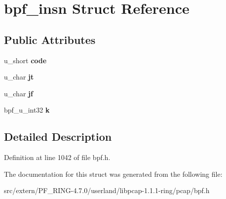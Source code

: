 \hypertarget{structbpf__insn}{
\section{bpf\_\-insn Struct Reference}
\label{structbpf__insn}
}
\subsection*{Public Attributes}
\begin{DoxyCompactItemize}
\item 
\hypertarget{structbpf__insn_a2da51f391465c2aa6d2bc4f88c9375f6}{
u\_\-short {\bfseries code}}
\label{structbpf__insn_a2da51f391465c2aa6d2bc4f88c9375f6}

\item 
\hypertarget{structbpf__insn_afd246d9d966166aa20443bdb4f02a924}{
u\_\-char {\bfseries jt}}
\label{structbpf__insn_afd246d9d966166aa20443bdb4f02a924}

\item 
\hypertarget{structbpf__insn_a7b51623c2f103793373f27465b7ce840}{
u\_\-char {\bfseries jf}}
\label{structbpf__insn_a7b51623c2f103793373f27465b7ce840}

\item 
\hypertarget{structbpf__insn_a233c23ce0d655662de5fb43607c498bf}{
bpf\_\-u\_\-int32 {\bfseries k}}
\label{structbpf__insn_a233c23ce0d655662de5fb43607c498bf}

\end{DoxyCompactItemize}


\subsection{Detailed Description}


Definition at line 1042 of file bpf.h.



The documentation for this struct was generated from the following file:\begin{DoxyCompactItemize}
\item 
src/extern/PF\_\-RING-\/4.7.0/userland/libpcap-\/1.1.1-\/ring/pcap/bpf.h\end{DoxyCompactItemize}
